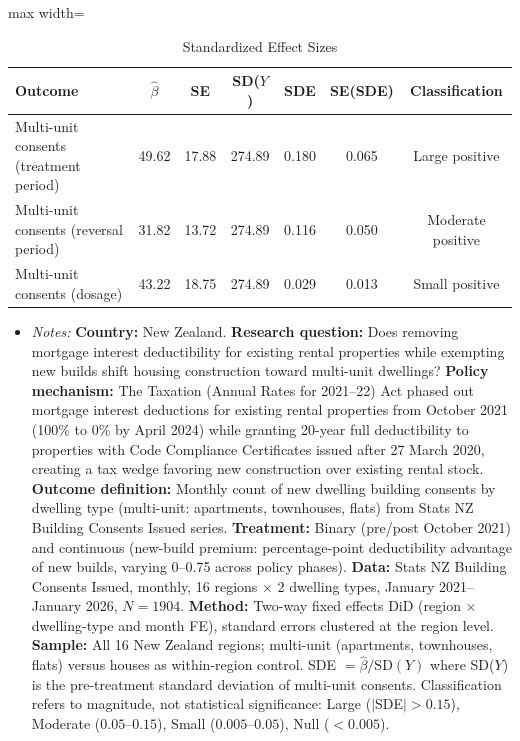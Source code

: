 \begin{table}[t]
\centering
\caption{Standardized Effect Sizes}
\label{tab:sde}
\footnotesize
\begin{adjustbox}{max width=\textwidth}
\begin{tabular}{lcccccc}
\toprule
Outcome & $\hat{\beta}$ & SE & SD($Y$) & SDE & SE(SDE) & Classification \\
\midrule
Multi-unit consents (treatment period) & 49.62 & 17.88 & 274.89 & 0.180 & 0.065 & Large positive \\
Multi-unit consents (reversal period) & 31.82 & 13.72 & 274.89 & 0.116 & 0.050 & Moderate positive \\
Multi-unit consents (dosage) & 43.22 & 18.75 & 274.89 & 0.029 & 0.013 & Small positive \\
\bottomrule
\end{tabular}
\end{adjustbox}
\begin{itemize}[leftmargin=*,nosep]
\footnotesize
\item \textit{Notes:} \textbf{Country:} New Zealand. \textbf{Research question:} Does removing mortgage interest deductibility for existing rental properties while exempting new builds shift housing construction toward multi-unit dwellings? \textbf{Policy mechanism:} The Taxation (Annual Rates for 2021--22) Act phased out mortgage interest deductions for existing rental properties from October 2021 (100\% to 0\% by April 2024) while granting 20-year full deductibility to properties with Code Compliance Certificates issued after 27 March 2020, creating a tax wedge favoring new construction over existing rental stock. \textbf{Outcome definition:} Monthly count of new dwelling building consents by dwelling type (multi-unit: apartments, townhouses, flats) from Stats NZ Building Consents Issued series. \textbf{Treatment:} Binary (pre/post October 2021) and continuous (new-build premium: percentage-point deductibility advantage of new builds, varying 0--0.75 across policy phases). \textbf{Data:} Stats NZ Building Consents Issued, monthly, 16 regions $\times$ 2 dwelling types, January 2021--January 2026, $N = 1904$. \textbf{Method:} Two-way fixed effects DiD (region $\times$ dwelling-type and month FE), standard errors clustered at the region level. \textbf{Sample:} All 16 New Zealand regions; multi-unit (apartments, townhouses, flats) versus houses as within-region control. SDE $= \hat{\beta} / \text{SD}(Y)$ where SD($Y$) is the pre-treatment standard deviation of multi-unit consents. Classification refers to magnitude, not statistical significance: Large ($|$SDE$| > 0.15$), Moderate ($0.05$--$0.15$), Small ($0.005$--$0.05$), Null ($< 0.005$). 
\end{itemize}
\end{table}
